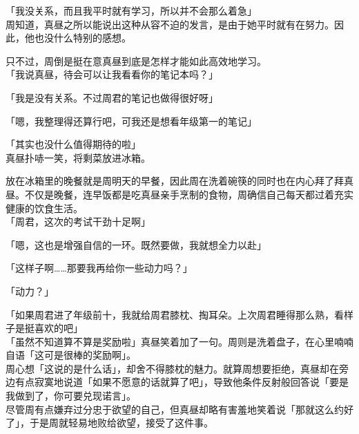 「我没关系，而且我平时就有学习，所以并不会那么着急」\\

周知道，真昼之所以能说出这种从容不迫的发言，是由于她平时就有在努力。因此，他也没什么特别的感想。

只不过，周倒是挺在意真昼到底是怎样才能如此高效地学习。\\

「我说真昼，待会可以让我看看你的笔记本吗？」

「我是没有关系。不过周君的笔记也做得很好呀」

「嗯，我整理得还算行吧，可我还是想看年级第一的笔记」

「其实也没什么值得期待的啦」\\

真昼扑哧一笑，将剩菜放进冰箱。

放在冰箱里的晚餐就是周明天的早餐，因此周在洗着碗筷的同时也在内心拜了拜真昼。不仅是晚餐，连早饭都是吃真昼亲手烹制的食物，周确信自己每天都过着充实健康的饮食生活。\\

「周君，这次的考试干劲十足啊」

「嗯，这也是增强自信的一环。既然要做，我就想全力以赴」

「这样子啊……那要我再给你一些动力吗？」

「动力？」

「如果周君进了年级前十，我就给周君膝枕、掏耳朵。上次周君睡得那么熟，看样子是挺喜欢的吧」\\

「虽然不知道算不算是奖励啦」真昼笑着加了一句。周则是洗着盘子，在心里喃喃自语「这可是很棒的奖励啊」。\\

周心想「这说的是什么话」，却舍不得膝枕的魅力。就算周想要拒绝，真昼却在旁边有点寂寞地说道「如果不愿意的话就算了吧」，导致他条件反射般回答说「要是我做到了，你可要兑现诺言」。\\

尽管周有点嫌弃过分忠于欲望的自己，但真昼却略有害羞地笑着说「那就这么约好了」，于是周就轻易地败给欲望，接受了这件事。
